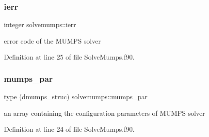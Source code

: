 \subsubsection{\texorpdfstring{ierr}{ierr}}
{\footnotesize\ttfamily integer solvemumps\+::ierr}



error code of the M\+U\+M\+PS solver 



Definition at line 25 of file Solve\+Mumps.\+f90.

\mbox{\label{namespacesolvemumps_ab76b5a7f705b0acb09ebc3ecf7e51f91}} 
\subsubsection{\texorpdfstring{mumps\+\_\+par}{mumps\_par}}
{\footnotesize\ttfamily type (dmumps\+\_\+struc) solvemumps\+::mumps\+\_\+par}



an array containing the configuration parameters of M\+U\+M\+PS solver 



Definition at line 24 of file Solve\+Mumps.\+f90.

